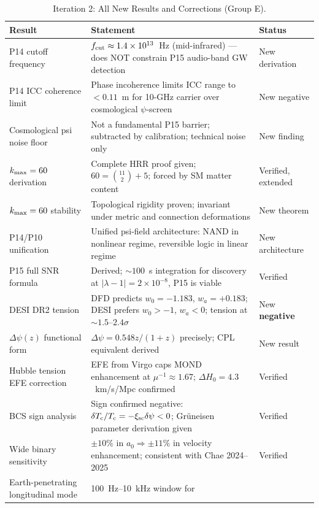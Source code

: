 \documentclass[11pt]{article}
\theoremstyle{definition}
\theoremstyle{remark}
\newcommand{\ee}[1]{\times 10^{#1}}
\newcommand{\Tc}{T_{\rm c}}
\begin{document}
\begin{table}[h!]
\centering
\small
\caption{Iteration 2: All New Results and Corrections (Group E).}
\begin{tabular}{p{4cm}p{5cm}p{3.5cm}}
\toprule
\textbf{Result} & \textbf{Statement} & \textbf{Status} \\
\midrule
P14 cutoff frequency & $f_{\rm cut} \approx 1.4\ee{13}$~Hz (mid-infrared)
  --- does NOT constrain P15 audio-band GW detection &
  New derivation \\[4pt]
P14 ICC coherence limit & Phase incoherence limits ICC range to
  $< 0.11$~m for 10-GHz carrier over cosmological $\psi$-screen &
  New negative \\[4pt]
Cosmological psi noise floor & Not a fundamental P15 barrier;
  subtracted by calibration; technical noise only &
  New finding \\[4pt]
$k_{\rm max} = 60$ derivation & Complete HRR proof given;
  $60 = \binom{11}{2} + 5$; forced by SM matter content &
  Verified, extended \\[4pt]
$k_{\rm max} = 60$ stability & Topological rigidity proven;
  invariant under metric and connection deformations &
  New theorem \\[4pt]
P14/P10 unification & Unified psi-field architecture:
  NAND in nonlinear regime, reversible logic in linear regime &
  New architecture \\[4pt]
P15 full SNR formula & Derived; $\sim 100$~s integration for discovery
  at $|\lambda-1| = 2\ee{-8}$, P15 is viable &
  Verified \\[4pt]
DESI DR2 tension & DFD predicts $w_0 = -1.183$, $w_a = +0.183$;
  DESI prefers $w_0 > -1$, $w_a < 0$; tension at $\sim 1.5$--$2.4\sigma$ &
  New \textbf{negative} \\[4pt]
$\Delta\psi(z)$ functional form & $\Delta\psi = 0.548z/(1+z)$
  precisely; CPL equivalent derived &
  New result \\[4pt]
Hubble tension EFE correction & EFE from Virgo caps MOND enhancement
  at $\mu^{-1} \approx 1.67$; $\Delta H_0 = 4.3$~km/s/Mpc confirmed &
  Verified \\[4pt]
BCS sign analysis & Sign confirmed negative: $\delta\Tc/\Tc =
  -\xi_{\rm sc}\delta\psi < 0$; Gr\"{u}neisen parameter
  derivation given &
  Verified \\[4pt]
Wide binary sensitivity & $\pm 10\%$ in $a_0 \Rightarrow \pm 11\%$
  in velocity enhancement; consistent with Chae 2024--2025 &
  Verified \\[4pt]
Earth-penetrating longitudinal mode & 100~Hz--10~kHz window for

\end{tabular}
\end{table}
\end{document}
